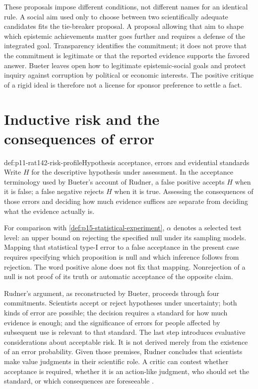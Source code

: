 These proposals impose different conditions, not different names for an
identical rule. A social aim used only to choose between two scientifically
adequate candidates fits the tie-breaker proposal. A proposal allowing that
aim to shape which epistemic achievements matter goes further and requires
a defense of the integrated goal. Transparency identifies the commitment;
it does not prove that the commitment is legitimate or that the reported
evidence supports the favored answer. Bueter leaves open how to legitimate
epistemic-social goals and protect inquiry against corruption by political
or economic interests. The positive critique of a rigid ideal is therefore
not a license for sponsor preference to settle a fact.

\section{Inductive risk and the consequences of error}
\label{sec:p11-rat142-inductive-risk}

\begin{hbdefinition}{def:p11-rat142-risk-profile}{Hypothesis acceptance, errors and evidential standards}
Write \(H\) for the descriptive hypothesis under assessment. In the
acceptance terminology used by Bueter's account of Rudner, a false positive
accepts \(H\) when it is false; a false negative rejects \(H\) when it is
true. Assessing the consequences of those errors and deciding how much
evidence suffices are separate from deciding what the evidence actually is.

For comparison with \cref{def:p15-statistical-experiment},
\(\alpha\) denotes a selected test level: an upper bound on rejecting
the specified null under its sampling models. Mapping that statistical
type-I error to a false acceptance in the present case requires specifying
which proposition is null and which inference follows from rejection.
The word positive alone does not fix that mapping. Nonrejection of a null
is not proof of its truth or automatic acceptance of the opposite claim.
\end{hbdefinition}

Rudner's argument, as reconstructed by Bueter, proceeds through four
commitments. Scientists accept or reject hypotheses under uncertainty;
both kinds of error are possible; the decision requires a standard for
how much evidence is enough; and the significance of errors for people
affected by subsequent use is relevant to that standard. The last step
introduces evaluative considerations about acceptable risk. It is not
derived merely from the existence of an error probability. Given those
premises, Rudner concludes that scientists make value judgments in their
scientific role. A critic can contest whether acceptance is required,
whether it is an action-like judgment, who should set the standard, or
which consequences are foreseeable
\cite[sec.~4, pp.~761--762]{Bueter2021ValueFreedom}.

